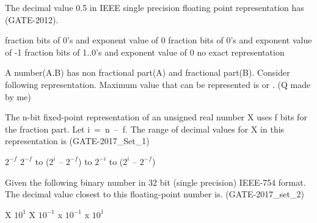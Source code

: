\begin{questyle}
  \question  The decimal value 0.5 in IEEE single precision floating point representation has (GATE-2012).

  \begin{choices}
    \choice         fraction bits of 0's and exponent value of 0
    \CorrectChoice  fraction bits of 0's and exponent value of -1
    \choice         fraction bits of 1..0's and exponent value of 0
    \choice         no exact representation
  \end{choices}
\end{questyle}

\begin{questyle}
  \question  A number(A.B) has non fractional part(A) and fractional part(B). Consider following
            representation. Maximum value that can be represented is \fillin[(\( 2^{n+f}\) -- 1)\( 2^{-f}\)] or
            \fillin[(\( 2^{n}\) -- \( 2^{-f}\))]. (Q made by me)
    \begin{center}  \end{center}
\end{questyle}

\begin{questyle}
  \question  The n-bit fixed-point representation of an unsigned real number X uses f bits for the
             fraction part. Let \mbox{i = n – f}. The range of decimal values for X in this representation is  (GATE-2017\_Set\_1)

  \begin{oneparchoices}
    \choice         \( 2^{-f}\)
    \choice         \( 2^{-f}\) to (\( 2^{i}\) -- \( 2^{-f}\))
     to \( 2^{-i}\)
     to (\( 2^{i}\) -- \( 2^{-f}\))
  \end{oneparchoices}
\end{questyle}

\begin{questyle}
  \question  Given the following binary number in 32 bit (single precision) IEEE-754 format.
             The decimal value closest to this floating-point number is. (GATE-2017\_set\_2)

  \begin{choices}
     X \(10^1\)
     X \(10^{-1}\)
     x \(10^{-1}\)
     x \(10^{1}\)
  \end{choices}
\end{questyle}

